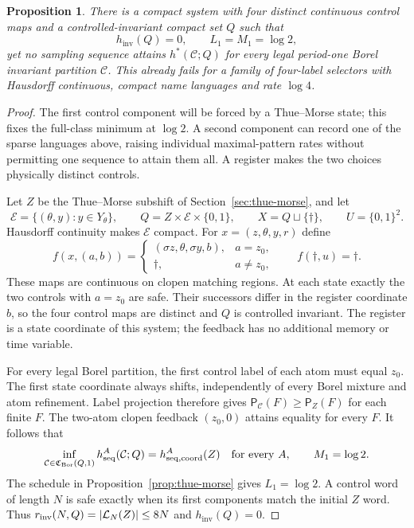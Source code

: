 \documentclass[11pt,reqno]{amsart}
\numberwithin{equation}{section}
\newtheorem{proposition}[theorem]{Proposition}
\theoremstyle{definition}
\theoremstyle{definition}
\newcommand{\C}{\mathcal C}
\newcommand{\Patt}{\mathsf P}
\newcommand{\hseq}{h_{\mathrm{seq}}}
\newcommand{\hpat}{h^{*}}
\newcommand{\hinv}{h_{\mathrm{inv}}}
\newcommand{\Bor}{\mathrm{Bor}}
\begin{document}
\begin{proposition}\label{prop:finite-pointwise}
There is a compact system with four distinct continuous control
maps and a controlled-invariant compact set $Q$ such that
\[
 \hinv(Q)=0,\qquad L_1=M_1=\log2,
\]
yet no sampling sequence attains $\hpat(\C;Q)$ for every legal
period-one Borel invariant partition $\C$.
This already fails for a family of four-label selectors with
Hausdorff continuous, compact name languages and rate $\log4$.
\end{proposition}
\begin{proof}
The first control component will be forced by a Thue--Morse state;
this fixes the full-class minimum at $\log2$. A second component
can record one of the sparse languages above, raising individual
maximal-pattern rates without permitting one sequence to attain them
all. A register makes the two choices physically distinct controls.

Let $Z$ be the Thue--Morse subshift of
Section~\ref{sec:thue-morse}, and let
\[
 \mathcal E=\{(\theta,y):y\in Y_\theta\},\qquad
 Q=Z\times\mathcal E\times\{0,1\},\qquad
 X=Q\sqcup\{\dagger\},\qquad U=\{0,1\}^2.
\]
Hausdorff continuity makes $\mathcal E$ compact.
For $x=(z,\theta,y,r)$ define
\[
 f(x,(a,b))=
 \begin{cases}
  (\sigma z,\theta,\sigma y,b),&a=z_0,\\
  \dagger,&a\ne z_0,
 \end{cases}
 \qquad f(\dagger,u)=\dagger.
\]
These maps are continuous on clopen matching regions. At each
state exactly the two controls with $a=z_0$ are safe. Their
successors differ in the register coordinate $b$, so the four
control maps are distinct and $Q$ is controlled invariant.
The register is a state coordinate of this system; the feedback
has no additional memory or time variable.

For every legal Borel partition, the first control label of
each atom must equal $z_0$. The first state coordinate always
shifts, independently of every Borel mixture and atom refinement.
Label projection therefore gives
$\Patt_\C(F)\ge\Patt_Z(F)$ for each finite $F$.
The two-atom clopen feedback $(z_0,0)$ attains equality for
every $F$. It follows that
\[
 \inf_{\C\in\mathfrak C_{\Bor}(Q,1)}\hseq^A(\C;Q)
 =h_{\rm seq,coord}^A(Z)\quad\text{for every }A,
 \qquad M_1=\log2.
\]
The schedule in Proposition~\ref{prop:thue-morse} gives
$L_1=\log2$. A control word of length $N$ is safe exactly
when its first components match the initial $Z$ word.
Thus $r_{\rm inv}(N,Q)=|\mathcal L_N(Z)|\le8N$ and $\hinv(Q)=0$.


\end{proof}
\end{document}
